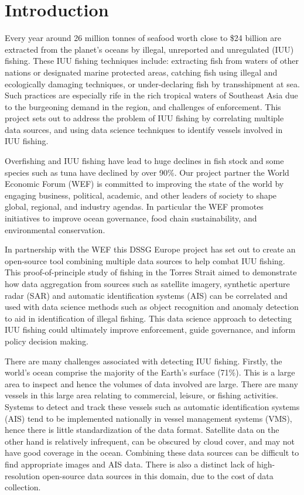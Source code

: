 \section{Introduction}
Every year around 26 million tonnes of seafood worth close to \$24 billion are extracted from the planet's oceans by illegal, unreported and unregulated (IUU) fishing. These IUU fishing techniques include: extracting fish from waters of other nations or designated marine protected areas, catching fish using illegal and ecologically damaging techniques, or under-declaring fish by transshipment at sea. Such practices are especially rife in the rich tropical waters of Southeast Asia due to the burgeoning demand in the region, and challenges of enforcement. This project sets out to address the problem of IUU fishing by correlating multiple data sources, and using data science techniques to identify vessels involved in IUU fishing.

Overfishing and IUU fishing have lead to huge declines in fish stock and some species such as tuna have declined by over 90\%. Our project partner the World Economic Forum (WEF) is committed to improving the state of the world by engaging business, political, academic, and other leaders of society to shape global, regional, and industry agendas. In particular the WEF promotes initiatives to improve ocean governance, food chain sustainability, and environmental conservation.

In partnership with the WEF this DSSG Europe project has set out to create an open-source tool combining multiple data sources to help combat IUU fishing. This proof-of-principle study of fishing in the Torres Strait aimed to demonstrate how data aggregation from sources such as satellite imagery, synthetic aperture radar (SAR) and automatic identification systems (AIS) can be correlated and used with data science methods such as object recognition and anomaly detection to aid in identification of illegal fishing. This data science approach to detecting IUU fishing could ultimately improve enforcement, guide governance, and inform policy decision making.

There are many challenges associated with detecting IUU fishing. Firstly, the world's ocean comprise the majority of the Earth's surface (71\%). This is a large area to inspect and hence the volumes of data involved are large. There are many vessels in this large area relating to commercial, leisure, or fishing activities. Systems to detect and track these vessels such as automatic identification systems (AIS) tend to be implemented nationally in vessel management systems (VMS), hence there is little standardization of the data format. Satellite data on the other hand is relatively infrequent, can be obscured by cloud cover, and may not have good coverage in the ocean. Combining these data sources can be difficult to find appropriate images and AIS data. There is also a distinct lack of high-resolution open-source data sources in this domain, due to the cost of data collection.

